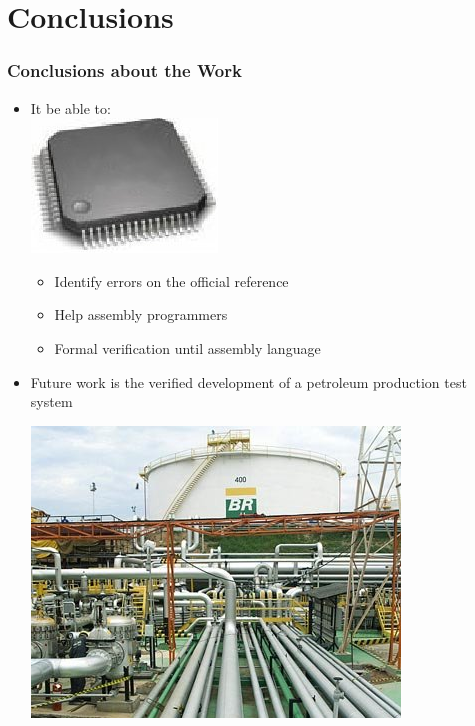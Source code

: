 \section{Conclusions}





 \begin{frame}
 \frametitle{Conclusions about the Work}
    
 \begin{itemize}
   \item It be able to: \ \ \ \ \ \ \ \ \ \ \ \ \ \ \ \ \ \ \ \ \ \ \ \ \ \ \ \ \ \ \ 
    \includegraphics[width=.2\textwidth]{figures/processador_generico.jpg}
 	\begin{itemize} 
 	  \item Identify  errors on the official reference
 	  \item Help assembly programmers
 	  \item Formal verification until assembly language 
     \end{itemize} 
     \item Future work is the verified development of a petroleum production test system\\ 
     \begin{center}   
 	   \includegraphics[height=.25\textheight]{figures/dutos.png}
	 \end{center}%
     
 \end{itemize} 
  	
 \end{frame}


